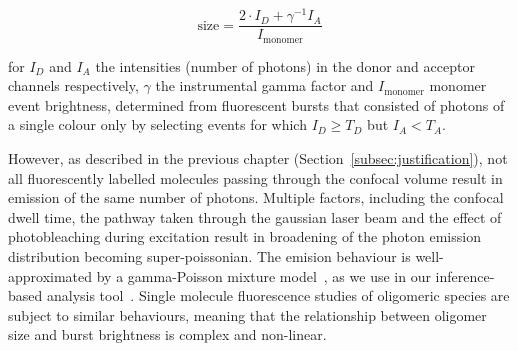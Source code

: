 \begin{equation}
\text{size} = \frac{2\cdot I_D + \gamma^{-1} I_A}{I_{\text{monomer}}}
\label{eq:size_linear}
\end{equation}

for $I_D$ and $I_A$ the intensities (number of photons) in the donor and acceptor channels respectively, $\gamma$ the instrumental gamma factor and $I_{\text{monomer}}$ monomer event brightness, determined from fluorescent bursts that consisted of photons of a single colour only by selecting events for which $I_D \geq T_D$ but $I_A < T_A$.

However, as described in the previous chapter (Section~\ref{subsec:justification}), not all fluorescently labelled molecules passing through the confocal volume result in emission of the same number of photons. Multiple factors, including the confocal dwell time, the pathway taken through the gaussian laser beam and the effect of photobleaching during excitation result in broadening of the photon emission distribution becoming super-poissonian. The emision behaviour is well-approximated by a gamma-Poisson mixture model~\cite{chen1999}, as we use in our inference-based analysis tool~\cite{murphy14}. Single molecule fluorescence studies of oligomeric species are subject to similar behaviours, meaning that the relationship between oligomer size and burst brightness is complex and non-linear. 



